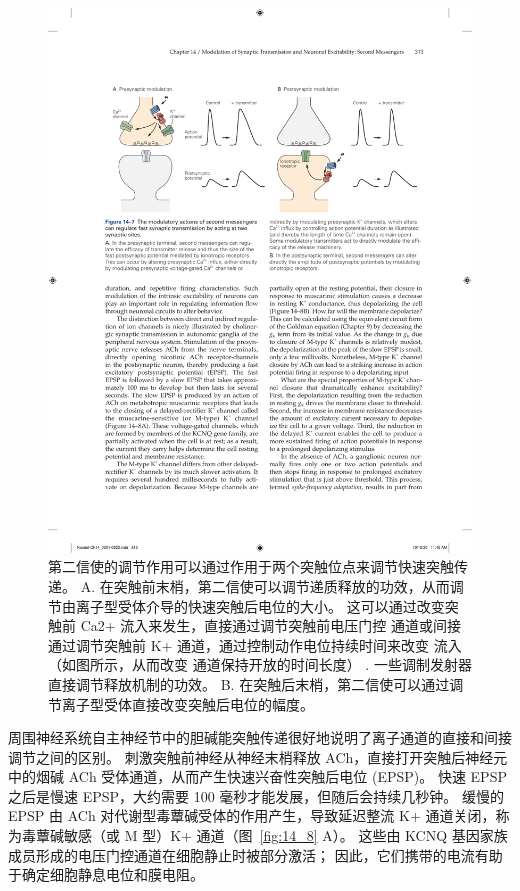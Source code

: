 \begin{figure}[htbp]
	\centering
	\includegraphics[width=0.9\linewidth]{chap14/fig_14_7}
	\caption{第二信使的调节作用可以通过作用于两个突触位点来调节快速突触传递。 A. 在突触前末梢，第二信使可以调节递质释放的功效，从而调节由离子型受体介导的快速突触后电位的大小。 这可以通过改变突触前 Ca2+ 流入来发生，直接通过调节突触前电压门控  通道或间接通过调节突触前 K+ 通道，通过控制动作电位持续时间来改变  流入（如图所示，从而改变  通道保持开放的时间长度） . 一些调制发射器直接调节释放机制的功效。 B. 在突触后末梢，第二信使可以通过调节离子型受体直接改变突触后电位的幅度。}
	\label{fig:14_7}
\end{figure}


周围神经系统自主神经节中的胆碱能突触传递很好地说明了离子通道的直接和间接调节之间的区别。
刺激突触前神经从神经末梢释放 ACh，直接打开突触后神经元中的烟碱 ACh 受体通道，从而产生快速兴奋性突触后电位 (EPSP)。
快速 EPSP 之后是慢速 EPSP，大约需要 100 毫秒才能发展，但随后会持续几秒钟。
缓慢的 EPSP 由 ACh 对代谢型毒蕈碱受体的作用产生，导致延迟整流 K+ 通道关闭，称为毒蕈碱敏感（或 M 型）K+ 通道（图~\ref{fig:14_8} A）。
这些由 KCNQ 基因家族成员形成的电压门控通道在细胞静止时被部分激活；
因此，它们携带的电流有助于确定细胞静息电位和膜电阻。


